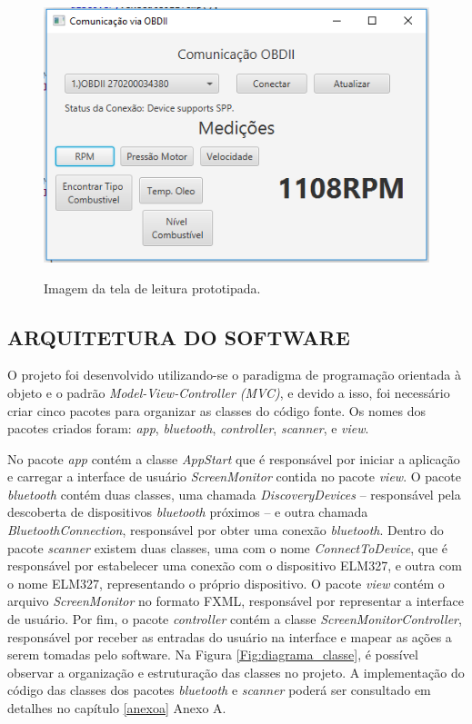 \begin{figure}[!ht]
\centering
\caption{Imagem da tela de leitura prototipada.} 
{\includegraphics[scale=.75]{imagens/telaLeituraJavaFx.PNG}}\\
 \label{Fig:tela_leitura_javafx}
\end{figure}

\subsection{ARQUITETURA DO SOFTWARE}
O projeto foi desenvolvido utilizando-se o paradigma de programação orientada à objeto e o padrão \textit{Model-View-Controller (MVC)}, e devido a isso, foi necessário criar cinco pacotes para organizar as classes do código fonte. Os nomes dos pacotes criados foram: \textit{app}, \textit{bluetooth}, \textit{controller}, \textit{scanner}, e \textit{view}.

No pacote \textit{app} contém a classe \textit{AppStart} que é responsável por iniciar a aplicação e carregar a interface de usuário \textit{ScreenMonitor} contida no pacote \textit{view}. O pacote \textit{bluetooth} contém duas classes, uma chamada \textit{DiscoveryDevices} – responsável pela descoberta de dispositivos \textit{bluetooth} próximos – e outra chamada \textit{BluetoothConnection}, responsável por obter uma conexão \textit{bluetooth}. Dentro do pacote \textit{scanner} existem duas classes, uma com o nome \textit{ConnectToDevice}, que é responsável por estabelecer uma conexão com o dispositivo ELM327, e outra com o nome ELM327, representando o próprio dispositivo. O pacote \textit{view} contém o arquivo \textit{ScreenMonitor} no formato FXML, responsável por representar a interface de usuário. Por fim, o pacote \textit{controller} contém a classe \textit{ScreenMonitorController}, responsável por receber as entradas do usuário na interface e mapear as ações a serem tomadas pelo software. Na Figura \ref{Fig:diagrama_classe}, é possível observar a organização e estruturação das classes no projeto. A implementação do código das classes dos pacotes \textit{bluetooth} e \textit{scanner} poderá ser consultado em detalhes no capítulo \ref{anexoa} Anexo A.

